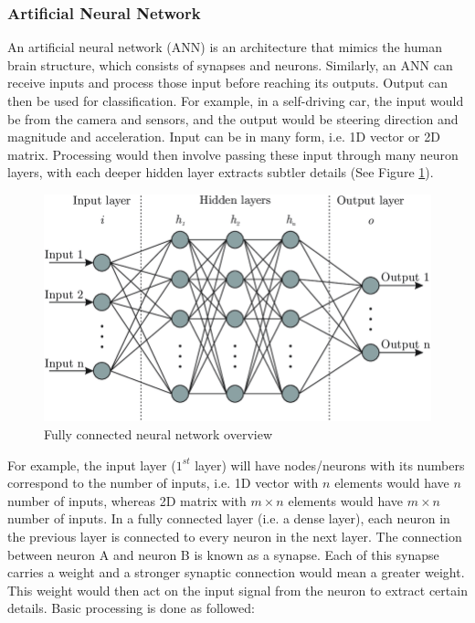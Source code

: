 \subsubsection{Artificial Neural Network}
\label{sect:ann}
An artificial neural network (ANN) is an architecture that mimics the human brain structure, which consists of synapses and neurons. Similarly, an ANN can receive inputs and process those input before reaching its outputs. Output can then be used for classification. For example, in a self-driving car, the input would be from the camera and sensors, and the output would be steering direction and magnitude and  acceleration. Input can be in many form, i.e. 1D vector or 2D matrix. Processing would then involve passing these input through many neuron layers, with each deeper hidden layer extracts subtler details (See Figure \ref{fig:nncomplex}).
\begin{figure}[H]
	\centering
	\includegraphics[scale=0.4]{nncomplex.png}
	\caption{Fully connected neural network overview \cite{rgnn}}
	\label{fig:nncomplex}
\end{figure}
For example, the input layer ($1^{st}$ layer) will have nodes/neurons with its numbers correspond to the number of inputs, i.e. 1D vector with $n$ elements would have $n$ number of inputs, whereas 2D matrix with $m\times n$ elements would have $m\times n$ number of inputs. In a fully connected layer (i.e. a dense layer), each neuron in the previous layer is connected to every neuron in the next layer. The connection between neuron A and neuron B is known as a synapse. Each of this synapse carries a weight and a stronger synaptic connection would mean a greater weight. This weight would then act on the input signal from the neuron to extract certain details. Basic processing is done as followed:

